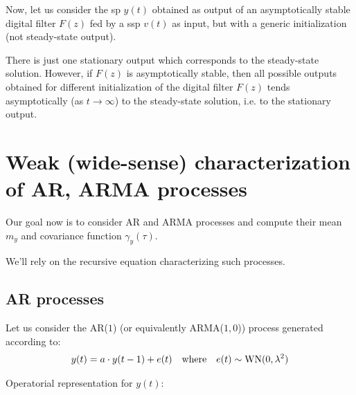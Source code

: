 Now, let us consider the \gls{sp} $y(t)$ obtained as output of an asymptotically stable digital filter $F(z)$ fed by a \gls{ssp} $v(t)$ as input, but with a generic initialization (not steady-state output).

\begin{figure}[htpb]
	\centering
\end{figure}
\FloatBarrier

\begin{theorem}
	There is just one stationary output which corresponds to the steady-state solution. However, if $F(z)$ is asymptotically stable, then all possible outputs obtained for different initialization of the digital filter $F(z)$ tends asymptotically (as $t \rightarrow \infty$) to the steady-state solution, i.e. to the stationary output.
\end{theorem}


\section{Weak (wide-sense) characterization of AR, ARMA processes}
Our goal now is to consider AR and ARMA processes and compute their mean $m_y$ and covariance function $\gamma_y(\tau)$.


We'll rely on the recursive equation characterizing such processes.

\subsection{AR processes}

Let us consider the AR($1$) (or equivalently ARMA($1,0$)) process generated according to:
\begin{align*}
	y(t)=a \cdot y(t-1)+e(t) \quad \text{where} \quad e(t) \sim \operatorname{WN}(0, \lambda^{2})
\end{align*}

Operatorial representation for $y(t)$:

